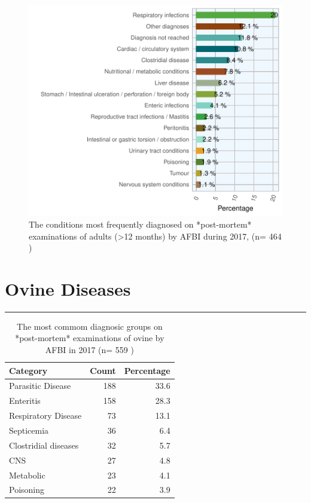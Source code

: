 \documentclass[]{book}
\begin{document}
\begin{figure}

{\centering \includegraphics{AFBI_files/figure-latex/unnamed-chunk-17-1} 

}

\caption{The conditions most frequently diagnosed on *post-mortem* examinations of  adults (>12 months) by AFBI during 2017, (n= 464 )}\label{fig:unnamed-chunk-17}
\end{figure}

\chapter{Ovine Diseases}\label{ovine-diseases}

\begin{center}\rule{0.5\linewidth}{\linethickness}\end{center}

\begin{table}

\caption{\label{tab:unnamed-chunk-21}The most commom diagnosic groups on *post-mortem* examinations of ovine by AFBI in 2017 (n= 559 )}
\centering
\begin{tabular}[t]{l|r|r}
\hline
Category & Count & Percentage\\
\hline
Parasitic Disease & 188 & 33.6\\
\hline
Enteritis & 158 & 28.3\\
\hline
Respiratory Disease & 73 & 13.1\\
\hline
Septicemia & 36 & 6.4\\
\hline
Clostridial diseases & 32 & 5.7\\
\hline
CNS & 27 & 4.8\\
\hline
Metabolic & 23 & 4.1\\
\hline
Poisoning & 22 & 3.9\\
\hline
\end{tabular}
\end{table}
\end{document}
